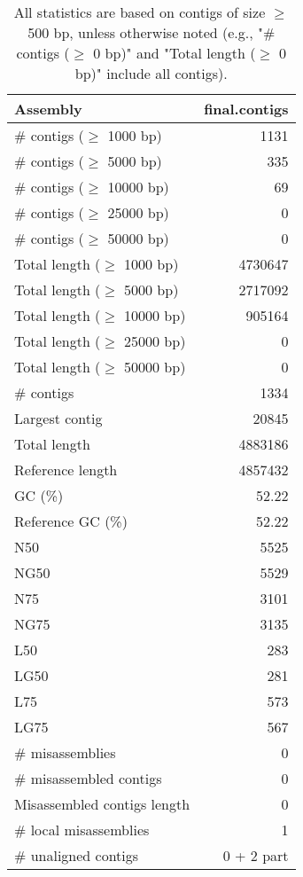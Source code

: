 \documentclass[12pt,a4paper]{article}
\begin{document}
\begin{table}[ht]
\begin{center}
\caption{All statistics are based on contigs of size $\geq$ 500 bp, unless otherwise noted (e.g., "\# contigs ($\geq$ 0 bp)" and "Total length ($\geq$ 0 bp)" include all contigs).}
\begin{tabular}{|l*{1}{|r}|}
\hline
Assembly & final.contigs \\ \hline
\# contigs ($\geq$ 1000 bp) & 1131 \\ \hline
\# contigs ($\geq$ 5000 bp) & 335 \\ \hline
\# contigs ($\geq$ 10000 bp) & 69 \\ \hline
\# contigs ($\geq$ 25000 bp) & 0 \\ \hline
\# contigs ($\geq$ 50000 bp) & 0 \\ \hline
Total length ($\geq$ 1000 bp) & 4730647 \\ \hline
Total length ($\geq$ 5000 bp) & 2717092 \\ \hline
Total length ($\geq$ 10000 bp) & 905164 \\ \hline
Total length ($\geq$ 25000 bp) & 0 \\ \hline
Total length ($\geq$ 50000 bp) & 0 \\ \hline
\# contigs & 1334 \\ \hline
Largest contig & 20845 \\ \hline
Total length & 4883186 \\ \hline
Reference length & 4857432 \\ \hline
GC (\%) & 52.22 \\ \hline
Reference GC (\%) & 52.22 \\ \hline
N50 & 5525 \\ \hline
NG50 & 5529 \\ \hline
N75 & 3101 \\ \hline
NG75 & 3135 \\ \hline
L50 & 283 \\ \hline
LG50 & 281 \\ \hline
L75 & 573 \\ \hline
LG75 & 567 \\ \hline
\# misassemblies & 0 \\ \hline
\# misassembled contigs & 0 \\ \hline
Misassembled contigs length & 0 \\ \hline
\# local misassemblies & 1 \\ \hline
\# unaligned contigs & 0 + 2 part \\ \hline

\end{tabular}
\end{center}
\end{table}
\end{document}
